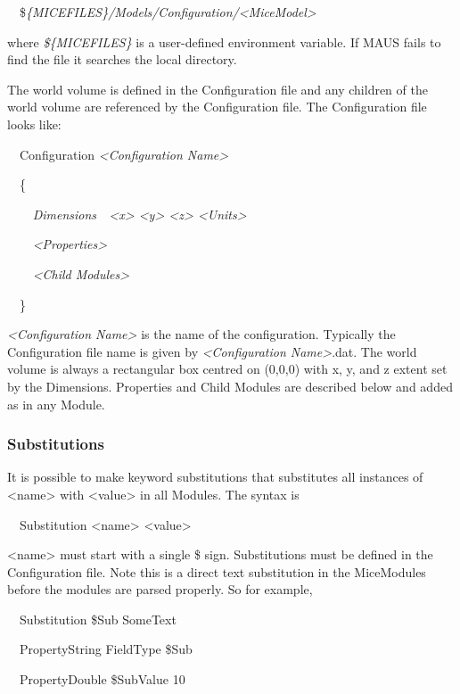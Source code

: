 \ \ \$\textit{\{MICEFILES\}/Models/Configuration/{\textless}MiceModel{\textgreater}}

where \textit{\$\{MICEFILES\}} is a user-defined environment variable. If MAUS fails to find the file it searches the
local directory.

The world volume is defined in the Configuration file and any children of the world volume are referenced by the
Configuration file. The Configuration file looks like:

{\ttfamily
\ \ Configuration \textit{{\textless}Configuration Name{\textgreater}}}

{\ttfamily
\ \ \{}

{\ttfamily\itshape
\ \ \ \ \textup{Dimensions\ \ }{\textless}x{\textgreater} {\textless}y{\textgreater} {\textless}z{\textgreater}
{\textless}Units{\textgreater}}

{\ttfamily\itshape
\ \ \ \ {\textless}Properties{\textgreater}}

{\ttfamily\itshape
\ \ \ \ {\textless}Child Modules{\textgreater}}

{\ttfamily
\ \ \}}

\textit{{\textless}Configuration Name{\textgreater}} is the name of the configuration. Typically the Configuration file
name is given by \textit{{\textless}Configuration Name{\textgreater}}.dat. The world volume is always a rectangular box
centred on (0,0,0) with x, y, and z extent set by the Dimensions. Properties and Child Modules are described below and
added as in any Module.

\subsubsection{Substitutions}
It is possible to make keyword substitutions that substitutes all instances of {\textless}name{\textgreater} with
{\textless}value{\textgreater} in all Modules. The syntax is

{\ttfamily
\ \ Substitution {\textless}name{\textgreater} {\textless}value{\textgreater}}

{\textless}name{\textgreater} must start with a single \$ sign. Substitutions must be defined in the Configuration file.
Note this is a direct text substitution in the MiceModules before the modules are parsed properly. So for example,

{\ttfamily
\ \ Substitution \$Sub SomeText}

{\ttfamily
\ \ PropertyString FieldType \$Sub}

{\ttfamily
\ \ PropertyDouble \$SubValue 10}

